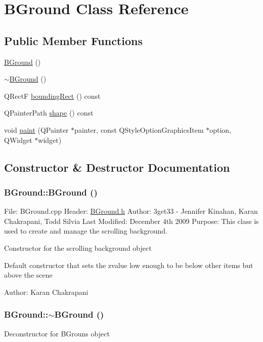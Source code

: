 \hypertarget{class_b_ground}{
\section{BGround Class Reference}
\label{class_b_ground}
}
\subsection*{Public Member Functions}
\begin{DoxyCompactItemize}
\item 
\hyperlink{class_b_ground_a29e5c74b2b48470ba1d55e77bcefb57c}{BGround} ()
\item 
\hyperlink{class_b_ground_a1a1a1af70fdaf8316fdfa4ec1248ddba}{$\sim$BGround} ()
\item 
QRectF \hyperlink{class_b_ground_ac125d3f6c2f54c7196a7716734836bc9}{boundingRect} () const 
\item 
QPainterPath \hyperlink{class_b_ground_a01af4fa4c14a465fc37d9f3ae2e22a73}{shape} () const 
\item 
void \hyperlink{class_b_ground_a806a00705841126f626e60ac76f6cbe6}{paint} (QPainter $\ast$painter, const QStyleOptionGraphicsItem $\ast$option, QWidget $\ast$widget)
\end{DoxyCompactItemize}


\subsection{Constructor \& Destructor Documentation}
\hypertarget{class_b_ground_a29e5c74b2b48470ba1d55e77bcefb57c}{
\subsubsection[{BGround}]{\setlength{\rightskip}{0pt plus 5cm}BGround::BGround ()}}
\label{class_b_ground_a29e5c74b2b48470ba1d55e77bcefb57c}
File: BGround.cpp Header: \hyperlink{bground_8h_source}{BGround.h} Author: 3get33 -\/ Jennifer Kinahan, Karan Chakrapani, Todd Silvia Last Modified: December 4th 2009 Purpose: This class is used to create and manage the scrolling background.

Constructor for the scrolling background object

Default constructor that sets the zvalue low enough to be below other items but above the scene

Author: Karan Chakrapani \hypertarget{class_b_ground_a1a1a1af70fdaf8316fdfa4ec1248ddba}{
\subsubsection[{$\sim$BGround}]{\setlength{\rightskip}{0pt plus 5cm}BGround::$\sim$BGround ()}}
\label{class_b_ground_a1a1a1af70fdaf8316fdfa4ec1248ddba}
Deconstructor for BGrouns object

